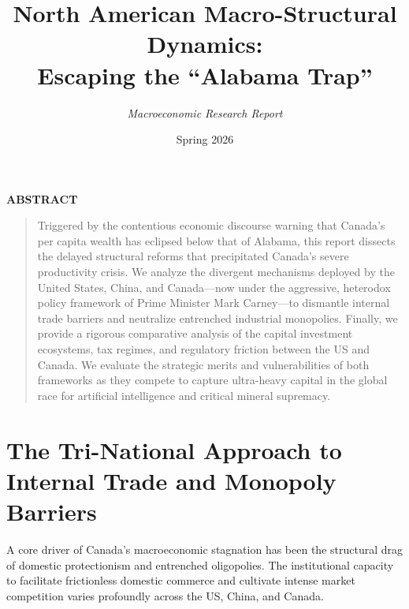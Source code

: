 \documentclass[11pt,a4paper]{article}
\title{\vspace{-1.5cm}\LARGE\textbf{North American Macro-Structural Dynamics:\\Escaping the ``Alabama Trap''}}
\author{\textit{Macroeconomic Research Report}}
\date{Spring 2026}
\begin{document}
\maketitle

\begin{center}
    \textbf{ABSTRACT}
\end{center}
\begin{quote}
    \small
    Triggered by the contentious economic discourse warning that Canada's per capita wealth has eclipsed below that of Alabama, this report dissects the delayed structural reforms that precipitated Canada's severe productivity crisis. We analyze the divergent mechanisms deployed by the United States, China, and Canada---now under the aggressive, heterodox policy framework of Prime Minister Mark Carney---to dismantle internal trade barriers and neutralize entrenched industrial monopolies. Finally, we provide a rigorous comparative analysis of the capital investment ecosystems, tax regimes, and regulatory friction between the US and Canada. We evaluate the strategic merits and vulnerabilities of both frameworks as they compete to capture ultra-heavy capital in the global race for artificial intelligence and critical mineral supremacy.
\end{quote}
\vspace{0.5cm}

\section{The Tri-National Approach to Internal Trade and Monopoly Barriers}

A core driver of Canada's macroeconomic stagnation has been the structural drag of domestic protectionism and entrenched oligopolies. The institutional capacity to facilitate frictionless domestic commerce and cultivate intense market competition varies profoundly across the US, China, and Canada.
\end{document}
